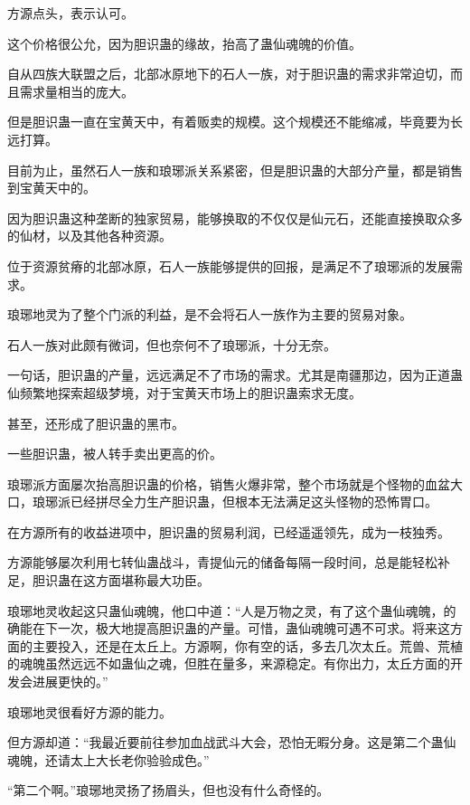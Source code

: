 
\begin{this_body}

方源点头，表示认可。

这个价格很公允，因为胆识蛊的缘故，抬高了蛊仙魂魄的价值。

自从四族大联盟之后，北部冰原地下的石人一族，对于胆识蛊的需求非常迫切，而且需求量相当的庞大。

但是胆识蛊一直在宝黄天中，有着贩卖的规模。这个规模还不能缩减，毕竟要为长远打算。

目前为止，虽然石人一族和琅琊派关系紧密，但是胆识蛊的大部分产量，都是销售到宝黄天中的。

因为胆识蛊这种垄断的独家贸易，能够换取的不仅仅是仙元石，还能直接换取众多的仙材，以及其他各种资源。

位于资源贫瘠的北部冰原，石人一族能够提供的回报，是满足不了琅琊派的发展需求。

琅琊地灵为了整个门派的利益，是不会将石人一族作为主要的贸易对象。

石人一族对此颇有微词，但也奈何不了琅琊派，十分无奈。

一句话，胆识蛊的产量，远远满足不了市场的需求。尤其是南疆那边，因为正道蛊仙频繁地探索超级梦境，对于宝黄天市场上的胆识蛊索求无度。

甚至，还形成了胆识蛊的黑市。

一些胆识蛊，被人转手卖出更高的价。

琅琊派方面屡次抬高胆识蛊的价格，销售火爆非常，整个市场就是个怪物的血盆大口，琅琊派已经拼尽全力生产胆识蛊，但根本无法满足这头怪物的恐怖胃口。

在方源所有的收益进项中，胆识蛊的贸易利润，已经遥遥领先，成为一枝独秀。

方源能够屡次利用七转仙蛊战斗，青提仙元的储备每隔一段时间，总是能轻松补足，胆识蛊在这方面堪称最大功臣。

琅琊地灵收起这只蛊仙魂魄，他口中道：“人是万物之灵，有了这个蛊仙魂魄，的确能在下一次，极大地提高胆识蛊的产量。可惜，蛊仙魂魄可遇不可求。将来这方面的主要投入，还是在太丘上。方源啊，你有空的话，多去几次太丘。荒兽、荒植的魂魄虽然远远不如蛊仙之魂，但胜在量多，来源稳定。有你出力，太丘方面的开发会进展更快的。”

琅琊地灵很看好方源的能力。

但方源却道：“我最近要前往参加血战武斗大会，恐怕无暇分身。这是第二个蛊仙魂魄，还请太上大长老你验验成色。”

“第二个啊。”琅琊地灵扬了扬眉头，但也没有什么奇怪的。


\end{this_body}
